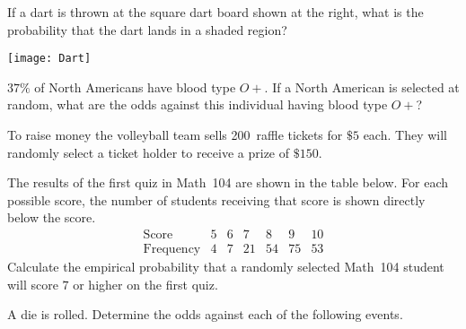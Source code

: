 \documentclass[addpoints,12pt]{exam}
\begin{document}
\begin{questions}

\question[10]
\begin{multicols}{2}
If a dart is thrown at the square dart board shown at the right,
what is the probability that the dart lands in a shaded region?\\
\begin{center}\texttt{[image: Dart]}\end{center}
\end{multicols}

\question[8] $37\%$ of North Americans have blood type $O+$.
If a North American is selected at random, what are the odds
against this individual having blood type $O+$?

\question[10] To raise money the volleyball team sells 200~raffle tickets
for $\$5$ each. They will randomly select a ticket holder to receive
a prize of $\$150$.

\question[10] The results of the first quiz in Math~104 are
shown in the table below. For each possible score, the number
of students receiving that score is shown directly below
the score.
\[\begin{array}{c|ccccccc}
\text{Score}&5&6&7&8&9&10\\\hline
\text{Frequency}&4&7&21&54&75&53
\end{array}\]
Calculate the empirical probability that a randomly
selected Math~104 student will score $7$ or higher
on the first quiz.

\question[12] A die is rolled. Determine the odds
against each of the following events.

\end{questions}
\end{document}
